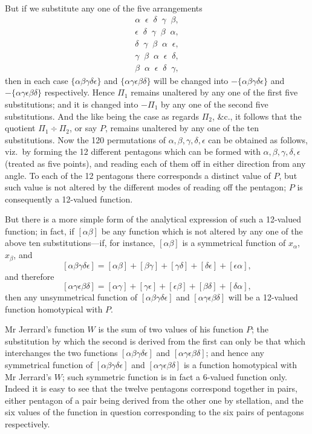 \documentclass[11pt,a4paper]{article}
\begin{document}
But if we substitute any one of the five arrangements
\begin{align*}
\alpha\;\;\epsilon\;\;\delta\;\;\gamma\;\;\beta,\\
\epsilon\;\;\delta\;\;\gamma\;\;\beta\;\;\alpha,\\
\delta\;\;\gamma\;\;\beta\;\;\alpha\;\;\epsilon,\\
\gamma\;\;\beta\;\;\alpha\;\;\epsilon\;\;\delta,\\
\beta\;\;\alpha\;\;\epsilon\;\;\delta\;\;\gamma,
\end{align*}
then in each case $\{\alpha\beta\gamma\delta\epsilon\}$ and $\{\alpha\gamma\epsilon\beta\delta\}$ will be changed into $-\{\alpha\beta\gamma\delta\epsilon\}$ and $-\{\alpha\gamma\epsilon\beta\delta\}$ respectively. Hence $\Pi_1$ remains unaltered by any one of the first five substitutions; and it is changed into $-\Pi_1$ by any one of the second five substitutions. And the like being the case as regards $\Pi_2$, \&c., it follows that the quotient $\Pi_1\div\Pi_2$, or say $P$, remains unaltered by any one of the ten substitutions. Now the 120 permutations of $\alpha,\beta,\gamma,\delta,\epsilon$ can be obtained as follows, viz.\ by forming the 12 different pentagons which can be formed with $\alpha,\beta,\gamma,\delta,\epsilon$ (treated as five points), and reading each of them off in either direction from any angle. To each of the 12 pentagons there corresponds a distinct value of $P$, but such value is not altered by the different modes of reading off the pentagon; $P$ is consequently a 12-valued function.

But there is a more simple form of the analytical expression of such a 12-valued function; in fact, if $[\alpha\beta]$ be any function which is not altered by any one of the above ten substitutions---if, for instance, $[\alpha\beta]$ is a symmetrical function of $x_\alpha$, $x_\beta$, and
\[
[\alpha\beta\gamma\delta\epsilon]=[\alpha\beta]+[\beta\gamma]+[\gamma\delta]+[\delta\epsilon]+[\epsilon\alpha],
\]
and therefore
\[
[\alpha\gamma\epsilon\beta\delta]=[\alpha\gamma]+[\gamma\epsilon]+[\epsilon\beta]+[\beta\delta]+[\delta\alpha],
\]
then any unsymmetrical function of $[\alpha\beta\gamma\delta\epsilon]$ and $[\alpha\gamma\epsilon\beta\delta]$ will be a 12-valued function homotypical with $P$.

Mr Jerrard's function $W$ is the sum of two values of his function $P$; the substitution by which the second is derived from the first can only be that which interchanges the two functions $[\alpha\beta\gamma\delta\epsilon]$ and $[\alpha\gamma\epsilon\beta\delta]$; and hence any symmetrical function of $[\alpha\beta\gamma\delta\epsilon]$ and $[\alpha\gamma\epsilon\beta\delta]$ is a function homotypical with Mr Jerrard's $W$; such symmetric function is in fact a 6-valued function only. Indeed it is easy to see that the twelve pentagons correspond together in pairs, either pentagon of a pair being derived from the other one by stellation, and the six values of the function in question corresponding to the six pairs of pentagons respectively.
\end{document}
